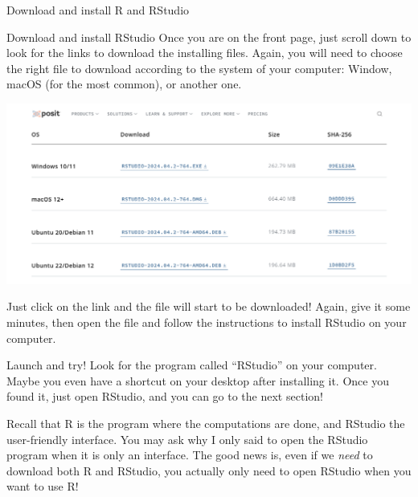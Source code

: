 \documentclass[
  ignorenonframetext,
]{beamer}
\begin{document}
\begin{frame}{Download and install R and RStudio}
\begin{block}{Download and install RStudio}
Once you are on the front page, just scroll down to look for the links
to download the installing files. Again, you will need to choose the
right file to download according to the system of your computer: Window,
macOS (for the most common), or another one.

\includegraphics{./assets/images/RStudioWebsite_Download.png}

Just click on the link and the file will start to be downloaded! Again,
give it some minutes, then open the file and follow the instructions to
install RStudio on your computer.
\end{block}
\end{frame}

\begin{frame}{Launch and try!}
\protect\hypertarget{launch-and-try}{}
Look for the program called ``RStudio'' on your computer. Maybe you even
have a shortcut on your desktop after installing it. Once you found it,
just open RStudio, and you can go to the next section!

\begin{tcolorbox}[enhanced jigsaw, colback=white, opacityback=0, bottomrule=.15mm, colframe=quarto-callout-tip-color-frame, rightrule=.15mm, left=2mm, colbacktitle=quarto-callout-tip-color!10!white, leftrule=.75mm, opacitybacktitle=0.6, bottomtitle=1mm, toprule=.15mm, coltitle=black, breakable, toptitle=1mm, titlerule=0mm, title=\textcolor{quarto-callout-tip-color}{\faLightbulb}\hspace{0.5em}{Think about it}, arc=.35mm]

Recall that R is the program where the computations are done, and
RStudio the user-friendly interface. You may ask why I only said to open
the RStudio program when it is only an interface. The good news is, even
if we \emph{need} to download both R and RStudio, you actually only need
to open RStudio when you want to use R!

\end{tcolorbox}
\end{frame}
\end{document}
